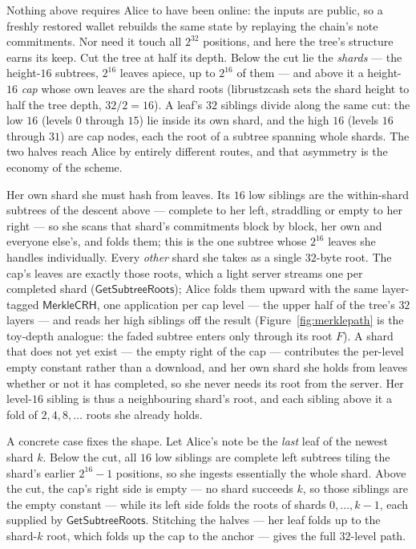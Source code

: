 \documentclass[11pt,a4paper]{article}
\theoremstyle{definition}
\begin{document}
Nothing above requires Alice to have been online: the inputs are public, so a
freshly restored wallet rebuilds the same state by replaying the chain's note
commitments. Nor need it touch all $2^{32}$ positions, and here the tree's
structure earns its keep. Cut the tree at half its depth. Below the cut lie
the \emph{shards} --- the height-$16$ subtrees, $2^{16}$ leaves apiece, up to
$2^{16}$ of them --- and above it a height-$16$ \emph{cap} whose own leaves are
the shard roots (librustzcash sets the shard height to half the tree depth,
$32/2 = 16$). A leaf's $32$ siblings divide along the same cut: the low $16$
(levels $0$ through $15$) lie inside its own shard, and the high $16$ (levels
$16$ through $31$) are cap nodes, each the root of a subtree spanning whole
shards. The two halves reach Alice by entirely different routes, and that
asymmetry is the economy of the scheme.

Her own shard she must hash from leaves. Its $16$ low siblings are the
within-shard subtrees of the descent above --- complete to her left, straddling
or empty to her right --- so she scans that shard's commitments block by block,
her own and everyone else's, and folds them; this is the one subtree whose
$2^{16}$ leaves she handles individually. Every \emph{other} shard she takes as
a single $32$-byte root. The cap's leaves are exactly those roots, which a light
server streams one per completed shard ($\mathsf{GetSubtreeRoots}$); Alice folds
them upward with the same layer-tagged $\mathsf{MerkleCRH}$, one application per
cap level --- the upper half of the tree's $32$ layers --- and reads her high
siblings off the result (Figure~\ref{fig:merklepath} is the toy-depth analogue:
the faded subtree enters only through its root $F$). A shard that does not yet
exist --- the empty right of the cap --- contributes the per-level empty
constant rather than a download, and her own shard she holds from leaves whether
or not it has completed, so she never needs its root from the server. Her
level-$16$ sibling is thus a neighbouring shard's root, and each sibling above
it a fold of $2, 4, 8, \dots$ roots she already holds.

A concrete case fixes the shape. Let Alice's note be the \emph{last} leaf of the
newest shard $k$. Below the cut, all $16$ low siblings are complete left
subtrees tiling the shard's earlier $2^{16} - 1$ positions, so she ingests
essentially the whole shard. Above the cut, the cap's right side is empty --- no
shard succeeds $k$, so those siblings are the empty constant --- while its left
side folds the roots of shards $0, \dots, k-1$, each supplied by
$\mathsf{GetSubtreeRoots}$. Stitching the halves --- her leaf folds up to the
shard-$k$ root, which folds up the cap to the anchor --- gives the full
$32$-level path.
\end{document}
